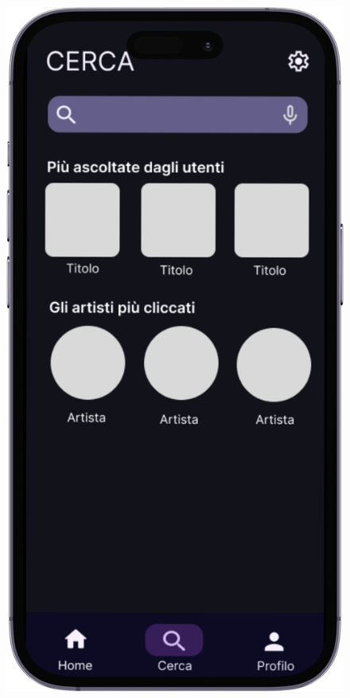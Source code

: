 \documentclass{article}
\begin{document}
\begin{figure}[htbp]
\begin{minipage}{0.18\textwidth}
					\includegraphics[width=\textwidth]{foto4}
				\end{minipage}
				\hfill
				\begin{minipage}{0.18\textwidth}

\end{minipage}
\end{figure}
\end{document}

